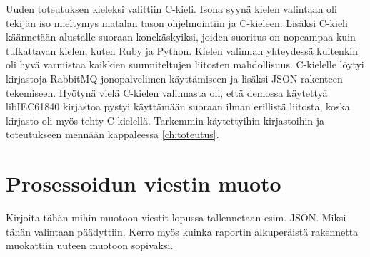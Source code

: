 Uuden toteutuksen kieleksi valittiin C-kieli. Isona syynä kielen valintaan oli tekijän iso mieltymys matalan tason ohjelmointiin ja C-kieleen. Lisäksi C-kieli käännetään alustalle suoraan konekäskyiksi, joiden suoritus on nopeampaa kuin tulkattavan kielen, kuten Ruby ja Python. Kielen valinnan yhteydessä kuitenkin oli hyvä varmistaa kaikkien suunniteltujen liitosten mahdollisuus. C-kielelle löytyi kirjastoja RabbitMQ-jonopalvelimen käyttämiseen ja lisäksi JSON rakenteen tekemiseen. Hyötynä vielä C-kielen valinnasta oli, että demossa käytettyä libIEC61840 kirjastoa pystyi käyttämään suoraan ilman erillistä liitosta, koska kirjasto oli myös tehty C-kielellä. Tarkemmin käytettyihin kirjastoihin ja toteutukseen mennään kappaleessa \ref{ch:toteutus}.


\section{Prosessoidun viestin muoto}
\begin{it}
	Kirjoita tähän mihin muotoon viestit lopussa tallennetaan esim. JSON. Miksi tähän valintaan päädyttiin. Kerro myös kuinka raportin alkuperäistä rakennetta muokattiin uuteen muotoon sopivaksi.
\end{it}